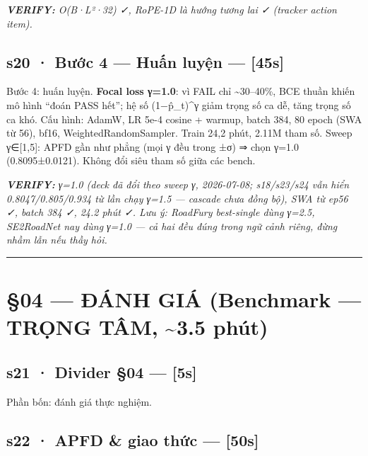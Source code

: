 \documentclass[
  11pt,
]{article}
\renewenvironment{quote}
  {\par\smallskip\noindent
   \def\FrameCommand{{\color{deckorange}\vrule width 2.5pt}\hspace{10pt}}%
   \MakeFramed{\advance\hsize-\width\FrameRestore}%
   \footnotesize\itshape\color{deckslate}}
  {\par\endMakeFramed\smallskip}
\begin{document}
\begin{quote}
\textbf{VERIFY:} O(B·L²·32) ✓, RoPE-1D là hướng tương lai ✓ (tracker
action item).
\end{quote}

\subsection{s20 · Bước 4 --- Huấn luyện ---
{[}45s{]}}\label{s20-bux1b0ux1edbc-4-huux1ea5n-luyux1ec7n-45s}

Bước 4: huấn luyện. \textbf{Focal loss γ=1.0}: vì FAIL chỉ
\textasciitilde30--40\%, BCE thuần khiến mô hình ``đoán PASS hết''; hệ
số (1−p̂\_t)\^{}γ giảm trọng số ca dễ, tăng trọng số ca khó. Cấu hình:
AdamW, LR 5e-4 cosine + warmup, batch 384, 80 epoch (SWA từ 56), bf16,
WeightedRandomSampler. Train 24,2 phút, 2.11M tham số. Sweep
γ∈{[}1,5{]}: APFD gần như phẳng (mọi γ đều trong ±σ) ⇒ chọn γ=1.0
(0.8095±0.0121). Không đổi siêu tham số giữa các bench.

\begin{quote}
\textbf{VERIFY:} γ=1.0 (deck đã đổi theo sweep γ, 2026-07-08;
s18/s23/s24 vẫn hiển 0.8047/0.805/0.934 từ lần chạy γ=1.5 --- cascade
chưa đồng bộ), SWA từ ep56 ✓, batch 384 ✓, 24.2 phút ✓. Lưu ý: RoadFury
best-single dùng γ=2.5, SE2RoadNet nay dùng γ=1.0 --- cả hai đều đúng
trong ngữ cảnh riêng, đừng nhầm lẫn nếu thầy hỏi.
\end{quote}

\begin{center}\rule{0.5\linewidth}{0.5pt}\end{center}

\section{§04 --- ĐÁNH GIÁ (Benchmark --- TRỌNG TÂM, \textasciitilde3.5
phút)}\label{ux111uxe1nh-giuxe1-benchmark-trux1ecdng-tuxe2m-3.5-phuxfat}

\subsection{s21 · Divider §04 --- {[}5s{]}}\label{s21-divider-04-5s}

Phần bốn: đánh giá thực nghiệm.

\subsection{s22 · APFD \& giao thức ---
{[}50s{]}}\label{s22-apfd-giao-thux1ee9c-50s}
\end{document}
